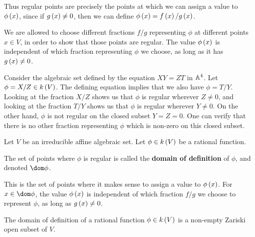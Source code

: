 Thus regular points are precisely the points at which we can assign a value to $ \phi\br{x} $, since if $ g\br{x} \ne 0 $, then we can define $ \phi\br{x} = f\br{x} / g\br{x} $.

\begin{note*}
We are allowed to choose different fractions $ f / g $ representing $ \phi $ at different points $ x \in V $, in order to show that those points are regular. The value $ \phi\br{x} $ is independent of which fraction representing $ \phi $ we choose, as long as it has $ g\br{x} \ne 0 $.
\end{note*}

\begin{example*}
Consider the algebraic set defined by the equation $ XY = ZT $ in $ \AA^4 $. Let $ \phi = X / Z \in k\br{V} $. The defining equation implies that we also have $ \phi = T / Y $. Looking at the fraction $ X / Z $ shows us that $ \phi $ is regular wherever $ Z \ne 0 $, and looking at the fraction $ T / Y $ shows us that $ \phi $ is regular wherever $ Y \ne 0 $. On the other hand, $ \phi $ is not regular on the closed subset $ Y = Z = 0 $. One can verify that there is no other fraction representing $ \phi $ which is non-zero on this closed subset.
\end{example*}


Let $ V $ be an irreducible affine algebraic set. Let $ \phi \in k\br{V} $ be a rational function.

\begin{definition*}
The set of points where $ \phi $ is regular is called the \textbf{domain of definition} of $ \phi $, and denoted $ \dom \phi $.
\end{definition*}

This is the set of points where it makes sense to assign a value to $ \phi\br{x} $. For $ x \in \dom \phi $, the value $ \phi\br{x} $ is independent of which fraction $ f / g $ we choose to represent $ \phi $, as long as $ g\br{x} \ne 0 $.

\begin{lemma}
\label{lem:domaindefinition}
The domain of definition of a rational function $ \phi \in k\br{V} $ is a non-empty Zariski open subset of $ V $.
\end{lemma}

